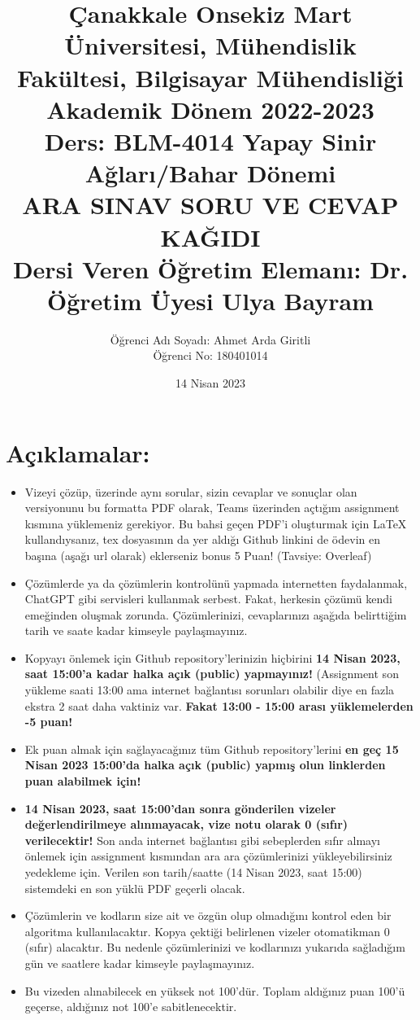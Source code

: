 \documentclass[11pt]{article}
\title{Çanakkale Onsekiz Mart Üniversitesi, Mühendislik Fakültesi, Bilgisayar Mühendisliği Akademik Dönem 2022-2023\\
Ders: BLM-4014 Yapay Sinir Ağları/Bahar Dönemi\\ 
ARA SINAV SORU VE CEVAP KAĞIDI\\
Dersi Veren Öğretim Elemanı: Dr. Öğretim Üyesi Ulya Bayram}
\author{%
\begin{minipage}{\textwidth}
\raggedright
Öğrenci Adı Soyadı: Ahmet Arda Giritli\\ %
Öğrenci No: 180401014
\end{minipage}%
}
\date{14 Nisan 2023}
\begin{document}
\maketitle

\vspace{-.5in}
\section*{Açıklamalar:}
\begin{itemize}
    \item Vizeyi çözüp, üzerinde aynı sorular, sizin cevaplar ve sonuçlar olan versiyonunu bu formatta PDF olarak, Teams üzerinden açtığım assignment kısmına yüklemeniz gerekiyor. Bu bahsi geçen PDF'i oluşturmak için LaTeX kullandıysanız, tex dosyasının da yer aldığı Github linkini de ödevin en başına (aşağı url olarak) eklerseniz bonus 5 Puan! (Tavsiye: Overleaf)
    \item Çözümlerde ya da çözümlerin kontrolünü yapmada internetten faydalanmak, ChatGPT gibi servisleri kullanmak serbest. Fakat, herkesin çözümü kendi emeğinden oluşmak zorunda. Çözümlerinizi, cevaplarınızı aşağıda belirttiğim tarih ve saate kadar kimseyle paylaşmayınız. 
    \item Kopyayı önlemek için Github repository'lerinizin hiçbirini \textbf{14 Nisan 2023, saat 15:00'a kadar halka açık (public) yapmayınız!} (Assignment son yükleme saati 13:00 ama internet bağlantısı sorunları olabilir diye en fazla ekstra 2 saat daha vaktiniz var. \textbf{Fakat 13:00 - 15:00 arası yüklemelerden -5 puan!}
    \item Ek puan almak için sağlayacağınız tüm Github repository'lerini \textbf{en geç 15 Nisan 2023 15:00'da halka açık (public) yapmış olun linklerden puan alabilmek için!}
    \item \textbf{14 Nisan 2023, saat 15:00'dan sonra gönderilen vizeler değerlendirilmeye alınmayacak, vize notu olarak 0 (sıfır) verilecektir!} Son anda internet bağlantısı gibi sebeplerden sıfır almayı önlemek için assignment kısmından ara ara çözümlerinizi yükleyebilirsiniz yedekleme için. Verilen son tarih/saatte (14 Nisan 2023, saat 15:00) sistemdeki en son yüklü PDF geçerli olacak.
    \item Çözümlerin ve kodların size ait ve özgün olup olmadığını kontrol eden bir algoritma kullanılacaktır. Kopya çektiği belirlenen vizeler otomatikman 0 (sıfır) alacaktır. Bu nedenle çözümlerinizi ve kodlarınızı yukarıda sağladığım gün ve saatlere kadar kimseyle paylaşmayınız.
    \item Bu vizeden alınabilecek en yüksek not 100'dür. Toplam aldığınız puan 100'ü geçerse, aldığınız not 100'e sabitlenecektir.

\end{itemize}
\end{document}

